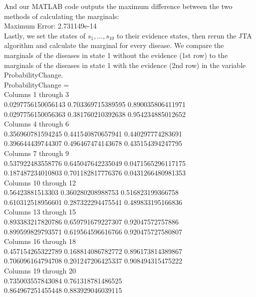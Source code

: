 \documentclass[11pt,a4paper,oneside]{report}
\begin{document}
And our MATLAB code outputs the maximum difference between the two methods of calculating the marginals:\\

Maximum Error: 2.731149e-14\\

Lastly, we set the states of $s_1,...,s_{10}$ to their evidence states, then rerun the JTA algorithm and calculate the marginal for every disease. We compare the marginals of the diseases in state 1 without the evidence (1st row) to the marginals of the diseases in state 1 with the evidence (2nd row) in the variable ProbabilityChange. \\

ProbabilityChange =\\
  Columns 1 through 3\\
        0.0297756150056143         0.703369715389595         0.890035806411971\\
        0.0297756150056363         0.381760210392638         0.954234885012652\\
  Columns 4 through 6\\
         0.356960781594245         0.441540870657941         0.440297774283691\\
         0.396644439744307         0.496467474143678         0.435154394247795\\
  Columns 7 through 9\\
         0.537922483558776         0.645047642235049        0.0471565296117175\\
         0.187487234010803         0.701182817776376        0.0431266480981353\\
  Columns 10 through 12\\
          0.56423881513303         0.360280208988753         0.516823199366758\\
         0.610312518956601         0.287322294475541         0.489833195166836\\
  Columns 13 through 15\\
         0.893383217820786         0.659791679227307          0.92047572757886\\
         0.899599829793571         0.619564596616766         0.920475727580807\\
  Columns 16 through 18\\
         0.457154265322789         0.168814086782772         0.896173814389867\\
         0.706096164794708         0.201247206425337         0.908494315475222\\
  Columns 19 through 20\\
         0.735003557843084         0.761318781486525\\
         0.864967251455448         0.883929046039115\\
         
\end{document}
